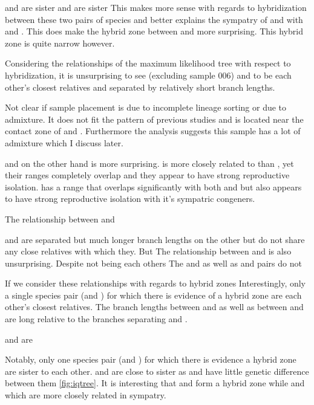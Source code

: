 \amer and \terr are sister
\fowl and \wood are sister
This makes more sense with regards to hybridization between these two pairs 
of species and better explains the sympatry of \americanus and \terrestris 
with \fowleri and \woodhousii.
This does make the hybrid zone between \amer and \hemiophrys more surprising. 
This hybrid zone is quite narrow however. 

Considering the relationships of the maximum likelihood tree with respect to 
hybridization, it is unsurprising to see \fowl (excluding sample 006) and \wood 
to be each other's closest relatives and separated by relatively short branch lengths.

Not clear if \fowl sample placement is due to incomplete lineage sorting or
due to admixture. It does not fit the pattern of previous studies and is located
near the contact zone of \wood and \fowl. Furthermore the \structure analysis 
suggests this sample has a lot of admixture which I discuss later.

\amer and \terr on the other hand is more surprising. 
\terr is more closely related to \fowl than \amer, yet their ranges completely  
overlap and they appear to have strong reproductive isolation.
\amer has a range that overlaps significantly with both \wood and \fowl but 
also appears to have strong reproductive isolation with it's sympatric congeners.

The relationship between \hemiophrys and \amer 

\hemiophrys and \amer are separated but much longer branch lengths on the other
but do not share any close relatives with which they.
But 
The relationship between \amer and \hemiophrys is also unsurprising.
Despite not being each others 
The \amer and \hemiophrys as well as \amer and \terr pairs do not   

If we consider these relationships with regards to hybrid zones 
Interestingly, only a single species pair (\fowl and \wood) for which there is  
evidence of a hybrid zone are each other's closest relatives.
The branch lengths between \amer and \hemiophrys as well as between \amer and \terr 
are long relative to the branches separating \wood and \fowl.

\terr and \fowl are 

Notably, only one species pair (\fowl and \wood) for which there is evidence a 
hybrid zone are sister to each other. 
\amer and \hemiophyrs are close to sister as \hemiophyrs and \baxteri have 
little genetic difference between them \cref{fig:iqtree}.
It is interesting that \amer and \terr form a hybrid zone while \fowl and \terr
which are more closely related in sympatry. 


